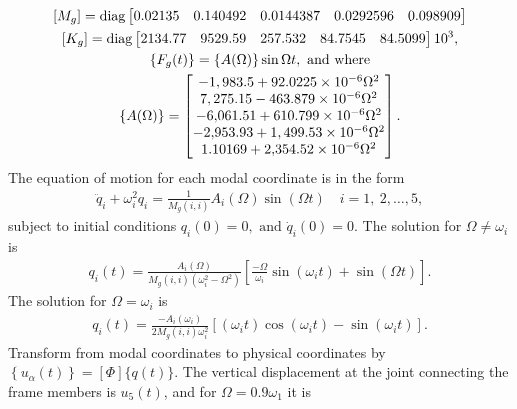\documentclass{AeroStructure-ERJohnson}
\begin{document}
\begin{example}
\begin{gather}
\left[M_{g}\right] =\operatorname{diag}\left[\begin{array}{@{}lllll@{}}0.02135 & 0.140492 & 0.0144387 & 0.0292596 & 0.098909\end{array}\right]\label{ex18.5r}\\
\left[K_{g}\right] =\operatorname{diag}\left[\begin{array}{@{}lllll@{}}2134.77 & 9529.59 & 257.532 & 84.7545 & 84.5099\end{array}\right] 10^{3},\nonumber\\
\left\{F_{g}(t)\right\}=\{A(\Omega)\} \sin \Omega t,\ \text{and where}\label{ex18.5s}\\
\{A(\Omega)\}=\left[\begin{array}{@{}c@{}}-1,983.5+92.0225 \times 10^{-6} \Omega^{2} \\7,275.15-463.879 \times 10^{-6} \Omega^{2} \\
-6{,}061.51+610.799 \times 10^{-6} \Omega^{2} \\
-2{,}953.93+1,499.53 \times 10^{-6} \Omega^{2} \\
1.10169+2{,}354.52 \times 10^{-6} \Omega^{2}
\end{array}\right].\label{ex18.5t}
\end{gather}
The equation of motion for each modal coordinate is in the form
\begin{align}\label{ex18.5u}
\ddot{q}_{i}+\omega_{i}^{2} q_{i}=\frac{1}{M_{g}(i, i)} A_{i}(\Omega) \sin (\Omega t) \quad i=1,~2, \ldots, 5,
\end{align}
subject to initial conditions $q_{i}(0)=0,\text{ and }\dot{q}_{i}(0)=0$. The solution for $\Omega \neq \omega_{i}$ is
\begin{align}\label{ex18.5v}
q_{i}(t)=\frac{A_{i}(\Omega)}{M_{g}(i, i)\left(\omega_{i}^{2}-\Omega^{2}\right)}\left[\frac{-\Omega}{\omega_{i}} \sin \left(\omega_{i} t\right)+\sin (\Omega t)\right].
\end{align}
The solution for $\Omega=\omega_{i}$ is
\begin{align}\label{ex18.5w}
q_{i}(t)=\frac{-A_{i}\left(\omega_{i}\right)}{2 M_{g}(i, i) \omega_{i}^{2}}\left[\left(\omega_{i} t\right) \cos \left(\omega_{i} t\right)-\sin \left(\omega_{i} t\right)\right].
\end{align}
Transform from modal coordinates to physical coordinates by $\left\{u_{\alpha}(t)\right\}=[\Phi]\{q(t)\}$. The vertical displacement at the joint connecting the frame members is $u_{5}(t)$, and for $\Omega=0.9 \omega_{1}$ it is

\end{example}
\end{document}
